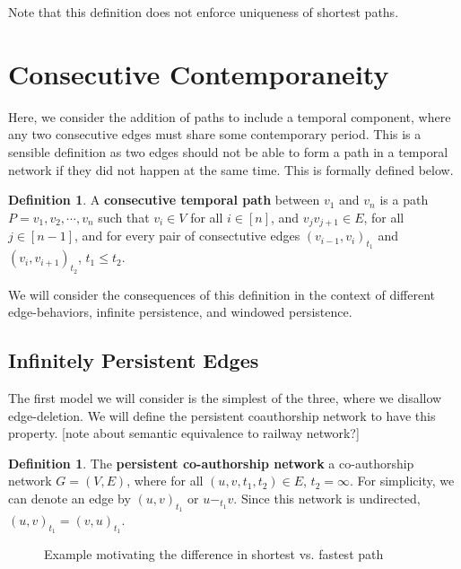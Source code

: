 \documentclass{article}
\theoremstyle{definition}
\newtheorem{defn}[thm]{Definition}
\numberwithin{thm}{subsection}
\begin{document}
Note that this definition does not enforce uniqueness of shortest paths.

\section{Consecutive Contemporaneity}

Here, we consider the addition of paths to include a temporal component, where
any two consecutive edges must share some contemporary period. This is a sensible
definition as two edges should not be able to form a path in a temporal network
if they did not happen at the same time. This is formally defined below.

\begin{defn}
  A \textbf{consecutive temporal path} between $v_1$ and $v_n$ is a path
  $P = v_1, v_2, \cdots, v_n$ such that $v_i \in V$ for all $i \in [n]$,
  and $v_jv_{j+1} \in E$, for all $j \in [n-1]$, and for every pair of
  consectutive edges $(v_{i-1},v_{i})_{t_1}$ and $(v_{i}, v_{i+1})_{t_2}$,
  $t_1 \leq t_2$.
\end{defn}

We will consider the consequences of this definition in the context of different
edge-behaviors, infinite persistence, and windowed persistence.

\subsection{Infinitely Persistent Edges}

The first model we will consider is the simplest of the three, where we disallow
edge-deletion. We will define the persistent coauthorship network to have this
property. [note about semantic equivalence to railway network?]

\begin{defn}
  The \textbf{persistent co-authorship network} a co-authorship network $G = (V,E)$,
  where for all $(u,v,t_1,t_2) \in E$, $t_2 = \infty$. For simplicity, we can
  denote an edge by $(u,v)_{t_1}$ or $u -_{t_1} v$. Since this network is
  undirected, $(u,v)_{t_1} = (v,u)_{t_1}$.
\end{defn}

\begin{figure}[ht] \centering
  \caption{Example motivating the difference in shortest vs. fastest path}
  \label{fig:infinite_edge_ex}
\end{figure}
\end{document}
